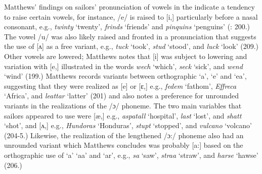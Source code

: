 Matthews’ findings on sailors’ pronunciation of vowels in the  indicate a tendency to raise certain vowels, for instance, /e/ is raised to [i,] particularly before a nasal consonant, e.g., \textit{twinty} ‘twenty’, \textit{frinds} ‘friends’ and \textit{pinquins} ‘penguins’ (\citealt{Matthews1935}: 200.) The vowel /u/ was also likely raised and fronted in a pronunciation that suggests the use of [ʌ] as a free variant, e.g., \textit{tuck} ‘took’, \textit{stud} ‘stood’, and \textit{luck} ‘look’ (209.) Other vowels are lowered; Matthews notes that [i] was subject to lowering and variation with [e,] illustrated in the words \textit{wech} ‘which’, \textit{seck} ‘sick’, and \textit{wend} ‘wind’ (199.) Matthews records variants between orthographic ‘a’, ‘e’ and ‘ea’, suggesting that they were realized as [e] or [ɛ,] e.g., \textit{fedem} ‘fathom’, \textit{Effreca} ‘Africa’, and \textit{leattar} ‘latter’ (201) and also notes a preference for unrounded variants in the realizations of the /ɔ/ phoneme. The two main variables that sailors appeared to use were [æ,] e.g., \textit{aspatall} ‘hospital’, \textit{last} ‘lost’, and \textit{shatt} ‘shot’, and [ʌ,] e.g., \textit{Hundoras} ‘Honduras’, \textit{stupt} ‘stopped’, and \textit{vulcano} ‘volcano’ (204-5.) Likewise, the realization of the lengthened /ɔ:/ phoneme also had an unrounded variant which Matthews concludes was probably [a:] based on the orthographic use of ‘a’ ‘aa’ and ‘ar’, e.g., \textit{sa} ‘saw’, \textit{straa} ‘straw’, and \textit{harse} ‘hawse’ (206.) 


